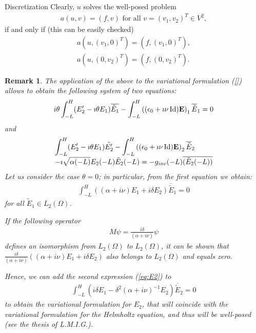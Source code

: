\documentclass[11pt]{amsart}
\newtheorem{remark}{Remark}
\newcommand{\E}{{\bf E}}
\begin{document}
\begin{subsection}{Discretization}
Clearly, $u$ solves the well-posed problem 
\begin{align*}
a(u, v)=(f,v)\text{ for all } v=(v_{1},v_{2})^{T}\in V^2, 
\end{align*}
if and only if (this can be easily checked)
\begin{align*}
a(u,(v_{1},0)^{T})=(f,(v_{1},0)^{T}),\\
a(u,(0,v_{2})^{T})=(f,(0,v_{2})^{T}).
\end{align*}


\begin{remark}
The application of the above to the variational formulation (\ref{}) allows to obtain the following system of two equations:
\[\begin{array}{l}
i\theta \displaystyle \int_{-L}^H (E_2' -\imath\theta E_1)\overline{\tilde E_1} - \int_{-L}^H \left((\epsilon_0 +\imath\nu \operatorname{Id}) \E\right)_{1} \overline{\tilde E}_{1}
=0
\end{array}
\]
and 
\begin{align}
\label{eq:E2}
\begin{array}{l}
\displaystyle \int_{-L}^H (E_2' -\imath\theta E_1)\tilde {E_2'} - \int_{-L}^H\left( (\epsilon_0 +\imath\nu\operatorname{Id}) \E\right)_{2}\overline{\tilde{E}}_{2}
\\ \displaystyle  - \imath \sqrt{\alpha(-L)} E_2 (-L) \tilde E_2 (-L) = -g_{inc} (-L) \overline{( \tilde E_2(-L) )} 
\end{array}
\end{align}
Let us consider the case $\theta=0$; in particular, from the first equation we obtain:
\begin{align*}
\int_{-L}^{H}\left((\alpha+i\nu)E_{1}+i\delta E_{2}\right)\overline{\tilde E}_{1}=0
\end{align*}
for all ${\tilde E}_{1}\in L_{2}(\Omega)$. 

If the following operator
\begin{align*}
M\psi = \frac{i\delta}{(\alpha+i\nu)}\psi
\end{align*}
defines an isomorphism from $L_{2}(\Omega)$ to $L_{2}(\Omega)$, it can be shown that 
$ \frac{i\delta}{(\alpha+i\nu)}\left((\alpha+i\nu)E_{1}+i\delta E_{2}\right)$ also belongs to $L_{2}(\Omega)$ and equals zero.

Hence, we can add the second expression (\ref{eq:E2}) to
\begin{align*}
\int_{-L}^{H}\left(i\delta E_{1}-\delta^2(\alpha+i\nu)^{-1} E_{2}\right)\overline{\tilde E}_{2}=0
\end{align*}
to obtain the variational formulation for $E_{2}$, that will coincide with the variational formulation for the Helmholtz equation, and thus will be well-posed (see the thesis of L.M.I.G.).


\end{remark}
\end{subsection}
\end{document}
